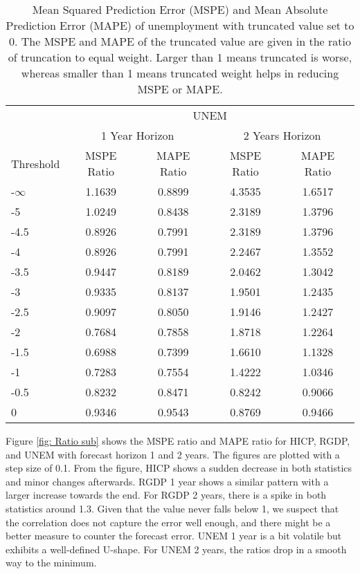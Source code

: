 \documentclass[11pt]{article}
\begin{document}
\begin{table}[!h] 
	\centering
	\caption{Mean Squared Prediction Error (MSPE) and Mean Absolute Prediction Error (MAPE) of unemployment with  truncated value set to 0. The MSPE and MAPE of the truncated value are given in the ratio of truncation to equal weight. Larger than 1 means truncated is worse, whereas smaller than 1 means truncated weight helps in reducing MSPE or MAPE.}
	\label{tab: MSPE UNEM}
	\begin{tabular}{lcccc}
		\hline\hline
		& \multicolumn{4}{c}{UNEM}                                                \\
		\cmidrule(lr){2-5}
		& \multicolumn{2}{c}{1 Year Horizon} & \multicolumn{2}{c}{2 Years Horizon} \\
		\cmidrule(lr){2-3} \cmidrule(lr){4-5}
		Threshold & MSPE Ratio &    MAPE Ratio    & MSPE Ratio &    MAPE Ratio    \\ 
		\hline
		-$\infty$ & 1.1639 & 0.8899 & 4.3535 & 1.6517\\ 
		-5 & 1.0249 & 0.8438 & 2.3189 & 1.3796\\ 
		-4.5 & 0.8926 & 0.7991 & 2.3189 & 1.3796\\ 
		-4 & 0.8926 & 0.7991 & 2.2467 & 1.3552\\ 
		-3.5 & 0.9447 & 0.8189 & 2.0462 & 1.3042\\ 
		-3 & 0.9335 & 0.8137 & 1.9501 & 1.2435\\ 
		-2.5 & 0.9097 & 0.8050 & 1.9146 & 1.2427\\ 
		-2 & 0.7684 & 0.7858 & 1.8718 & 1.2264\\ 
		-1.5 & 0.6988 & 0.7399 & 1.6610 & 1.1328\\ 
		-1 & 0.7283 & 0.7554 & 1.4222 & 1.0346\\ 
		-0.5 & 0.8232 & 0.8471 & 0.8242 & 0.9066\\ 
		0 & 0.9346 & 0.9543 & 0.8769 & 0.9466\\ \hline\hline
	\end{tabular}
\end{table}



Figure \ref{fig: Ratio sub} shows the MSPE ratio and MAPE ratio for HICP, RGDP, and UNEM with forecast horizon 1 and 2 years. The figures are plotted with a step size of 0.1. From the figure, HICP shows a sudden decrease in both statistics and minor changes afterwards. RGDP 1 year shows a similar pattern with a larger increase towards the end. For RGDP 2 years, there is a spike in both statistics around 1.3. Given that the value never falls below 1, we suspect that the correlation does not capture the error well enough, and there might be a better measure to counter the forecast error. UNEM 1 year is a bit volatile but exhibits a well-defined U-shape. For UNEM 2 years, the ratios drop in a smooth way to the minimum.
\end{document}
